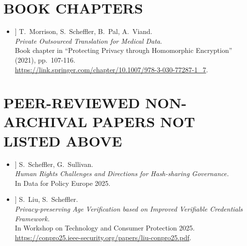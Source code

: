 \documentclass{res}
\begin{document}
\begin{resume}
\section{BOOK CHAPTERS}
\vspace{0.25in}

\edef\privateTranslation{[\arabic{citctr}]}

\begin{itemize}
\item[\privateTranslation] T.~Morrison, S.~Scheffler, B.~Pal, A.~Viand. \\
\emph{Private Outsourced Translation for Medical Data}. \\
Book chapter in ``Protecting Privacy through Homomorphic Encryption'' (2021), pp.~107-116. \\
\url{https://link.springer.com/chapter/10.1007/978-3-030-77287-1_7}.
\end{itemize}





\section{PEER-REVIEWED NON-ARCHIVAL PAPERS NOT LISTED ABOVE}
\vspace{0.25in}

\edef\dfpgifct{[\arabic{citctr}]}
\edef\conproageverif{[\arabic{citctr}]}

\begin{itemize}

\item[\dfpgifct] S.~Scheffler, G.~Sullivan. \\
\emph{Human Rights Challenges and Directions for Hash-sharing Governance.} \\
In Data for Policy Europe 2025.

\item[\conproageverif] S.~Liu, S.~Scheffler. \\
\emph{Privacy-preserving Age Verification based on Improved Verifiable Credentials Framework.} \\
In Workshop on Technology and Consumer Protection 2025. \\
\url{https://conpro25.ieee-security.org/papers/liu-conpro25.pdf}.
\end{itemize}




\end{resume}
\end{document}
